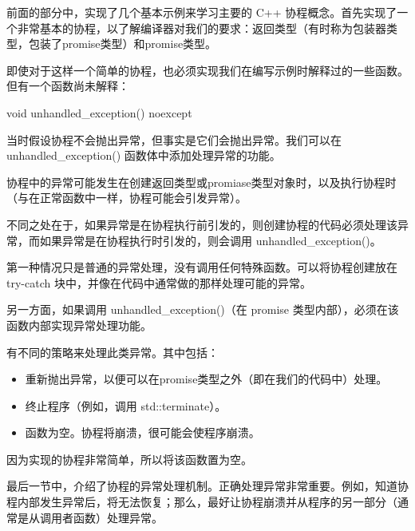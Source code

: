前面的部分中，实现了几个基本示例来学习主要的 C++ 协程概念。首先实现了一个非常基本的协程，以了解编译器对我们的要求：返回类型（有时称为包装器类型，包装了promise类型）和promise类型。

即使对于这样一个简单的协程，也必须实现我们在编写示例时解释过的一些函数。但有一个函数尚未解释：

\begin{cpp}
void unhandled_exception() noexcept {}
\end{cpp}

当时假设协程不会抛出异常，但事实是它们会抛出异常。我们可以在 unhandled\_exception() 函数体中添加处理异常的功能。

协程中的异常可能发生在创建返回类型或promiase类型对象时，以及执行协程时（与在正常函数中一样，协程可能会引发异常）。

不同之处在于，如果异常是在协程执行前引发的，则创建协程的代码必须处理该异常，而如果异常是在协程执行时引发的，则会调用 unhandled\_exception()。

第一种情况只是普通的异常处理，没有调用任何特殊函数。可以将协程创建放在 try-catch 块中，并像在代码中通常做的那样处理可能的异常。

另一方面，如果调用 unhandled\_exception()（在 promise 类型内部），必须在该函数内部实现异常处理功能。

有不同的策略来处理此类异常。其中包括：

\begin{itemize}
\item
重新抛出异常，以便可以在promise类型之外（即在我们的代码中）处理。

\item
终止程序（例如，调用 std::terminate）。

\item
函数为空。协程将崩溃，很可能会使程序崩溃。
\end{itemize}

因为实现的协程非常简单，所以将该函数置为空。

最后一节中，介绍了协程的异常处理机制。正确处理异常非常重要。例如，知道协程内部发生异常后，将无法恢复；那么，最好让协程崩溃并从程序的另一部分（通常是从调用者函数）处理异常。






